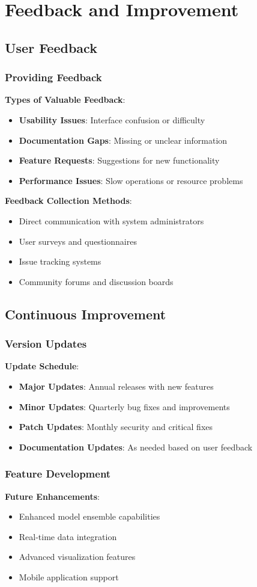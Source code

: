 \section{Feedback and Improvement}

\subsection{User Feedback}

\subsubsection{Providing Feedback}

\textbf{Types of Valuable Feedback}:
\begin{itemize}
    \item \textbf{Usability Issues}: Interface confusion or difficulty
    \item \textbf{Documentation Gaps}: Missing or unclear information
    \item \textbf{Feature Requests}: Suggestions for new functionality
    \item \textbf{Performance Issues}: Slow operations or resource problems
\end{itemize}

\textbf{Feedback Collection Methods}:
\begin{itemize}
    \item Direct communication with system administrators
    \item User surveys and questionnaires
    \item Issue tracking systems
    \item Community forums and discussion boards
\end{itemize}

\subsection{Continuous Improvement}

\subsubsection{Version Updates}

\textbf{Update Schedule}:
\begin{itemize}
    \item \textbf{Major Updates}: Annual releases with new features
    \item \textbf{Minor Updates}: Quarterly bug fixes and improvements
    \item \textbf{Patch Updates}: Monthly security and critical fixes
    \item \textbf{Documentation Updates}: As needed based on user feedback
\end{itemize}

\subsubsection{Feature Development}

\textbf{Future Enhancements}:
\begin{itemize}
    \item Enhanced model ensemble capabilities
    \item Real-time data integration
    \item Advanced visualization features
    \item Mobile application support
\end{itemize}